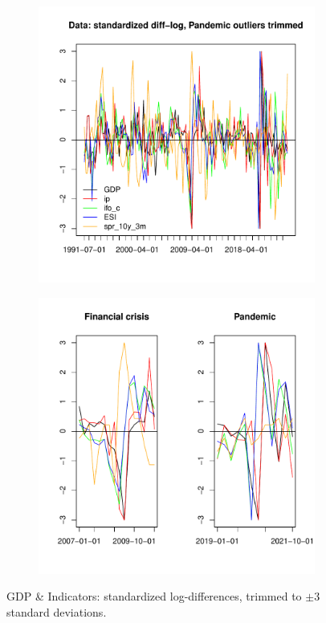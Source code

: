 \documentclass[11pt,a4paper]{article}
\begin{document}
\begin{figure}
  \begin{subfigure}[t]{0.49\textwidth}
    \centering
    \includegraphics[width=\linewidth]{./Figures/Data.pdf}
    \label{fig:data}
\end{subfigure}
\hfill
\begin{subfigure}[t]{0.49\textwidth}
    \centering
    \includegraphics[width=\linewidth]{./Figures/data_lags.pdf}
    \label{fig:data_lags}
\end{subfigure}
\caption{GDP \& Indicators: standardized log-differences, trimmed to $\pm 3$ standard deviations.}
\end{figure}
\end{document}

